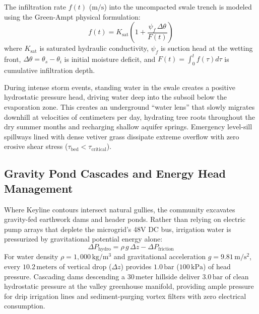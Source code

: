 The infiltration rate $f(t)$ ($\mathrm{m/s}$) into the uncompacted swale trench is modeled using the Green-Ampt physical formulation:
\begin{equation}
f(t) = K_{\mathrm{sat}} \left( 1 + \frac{\psi_f \, \Delta \theta}{F(t)} \right)
\label{eq:green_ampt_eco}
\end{equation}
where $K_{\mathrm{sat}}$ is saturated hydraulic conductivity, $\psi_f$ is suction head at the wetting front, $\Delta \theta = \theta_s - \theta_i$ is initial moisture deficit, and $F(t) = \int_0^t f(\tau) d\tau$ is cumulative infiltration depth. 

During intense storm events, standing water in the swale creates a positive hydrostatic pressure head, driving water deep into the subsoil below the evaporation zone. This creates an underground ``water lens'' that slowly migrates downhill at velocities of centimeters per day, hydrating tree roots throughout the dry summer months and recharging shallow aquifer springs. Emergency level-sill spillways lined with dense vetiver grass dissipate extreme overflow with zero erosive shear stress ($\tau_{\mathrm{bed}} < \tau_{\mathrm{critical}}$).

\subsection{Gravity Pond Cascades and Energy Head Management}
Where Keyline contours intersect natural gullies, the community excavates gravity-fed earthwork dams and header ponds. Rather than relying on electric pump arrays that deplete the microgrid's 48V DC bus, irrigation water is pressurized by gravitational potential energy alone:
\begin{equation}
\Delta P_{\mathrm{hydro}} = \rho \, g \, \Delta z - \Delta P_{\mathrm{friction}}
\label{eq:gravity_head}
\end{equation}
For water density $\rho = 1{,}000\,\mathrm{kg/m^3}$ and gravitational acceleration $g = 9.81\,\mathrm{m/s^2}$, every $10.2\,\mathrm{meters}$ of vertical drop ($\Delta z$) provides $1.0\,\mathrm{bar}$ ($100\,\mathrm{kPa}$) of head pressure. Cascading dams descending a $30\,\mathrm{meter}$ hillside deliver $3.0\,\mathrm{bar}$ of clean hydrostatic pressure at the valley greenhouse manifold, providing ample pressure for drip irrigation lines and sediment-purging vortex filters with zero electrical consumption.

